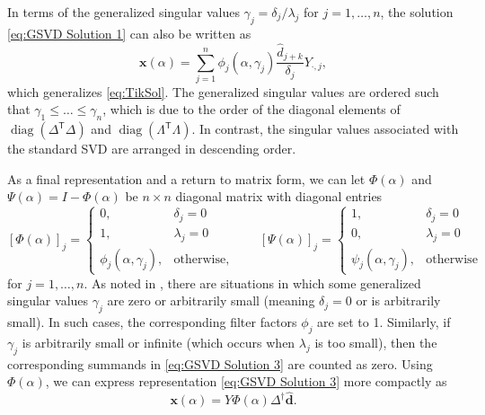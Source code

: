 \documentclass[12pt]{article}
\newcommand{\dVec}{\mathbf{d}}	%
\newcommand{\xVec}{\mathbf{x}}	%
\newcommand{\trans}[1]{{#1}^\mathsf{T}}	%
\newcommand{\pinv}[1]{{#1}^\dagger}	%
\DeclareMathOperator{\diag}{diag}	%
\newcommand{\regparam}{\alpha}  %
\newcommand{\filt}{\phi}
\newcommand{\mfilt}{\psi}
\newcommand{\svd}[1]{\widehat{#1}}	%
\begin{document}
In terms of the generalized singular values $\gamma_j = \delta_j/\lambda_j$ for $j = 1,\ldots,n$, the solution \eqref{eq:GSVD Solution 1} can also be written as
\begin{equation}
\label{eq:GSVD Solution 3}
\xVec(\regparam) = \sum_{j = 1}^{n} \filt_j\left(\regparam,\gamma_j\right) \frac{\svd{d}_{j+k}}{\delta_j} Y_{\cdot,j},
\end{equation}
which generalizes \eqref{eq:TikSol}. The generalized singular values are ordered such that $\gamma_1 \leq \ldots \leq \gamma_n$, which is due to the order of the diagonal elements of $\diag(\trans{\Delta}\Delta)$ and $\diag(\trans{\Lambda}\Lambda)$. In contrast, the singular values associated with the standard SVD are arranged in descending order. \par
As a final representation and a return to matrix form, we can let $\Phi(\regparam)$ and $\Psi(\regparam) = I - \Phi(\regparam)$ be $n \times n$ diagonal matrix with diagonal entries
\[\left[\Phi(\regparam)\right]_j = \begin{cases}
0, & \delta_j = 0 \\
1, & \lambda_j = 0 \\
\filt_j(\regparam,\gamma_j), & \text{otherwise,}
\end{cases} \qquad
[\Psi(\regparam)]_j = \begin{cases}
1, & \delta_j = 0 \\
0, & \lambda_j = 0 \\
\mfilt_j(\regparam,\gamma_j), & \text{otherwise}
\end{cases}\]
for $j = 1,\ldots,n$. As noted in \cite[p.~107]{ABT}, there are situations in which some generalized singular values $\gamma_j$ are zero or arbitrarily small (meaning $\delta_j = 0$ or is arbitrarily small). In such cases, the corresponding filter factors $\filt_j$ are set to 1. Similarly, if $\gamma_j$ is arbitrarily small or infinite (which occurs when $\lambda_j$ is too small), then the corresponding summands in \eqref{eq:GSVD Solution 3} are counted as zero. Using $\Phi(\regparam)$, we can express representation \eqref{eq:GSVD Solution 3} more compactly as
\[\xVec(\regparam) = Y\Phi(\regparam)\pinv{\Delta}\svd{\dVec}.\]
\end{document}
